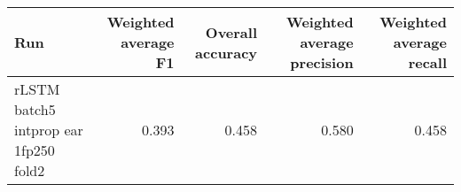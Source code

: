 \begin{tabular}{lrrrr}
\toprule
Run & Weighted average F1 & Overall accuracy & Weighted average precision & Weighted average recall \\
\midrule
rLSTM batch5 intprop ear 1fp250 fold2 & 0.393 & 0.458 & 0.580 & 0.458 \\
\bottomrule
\end{tabular}
